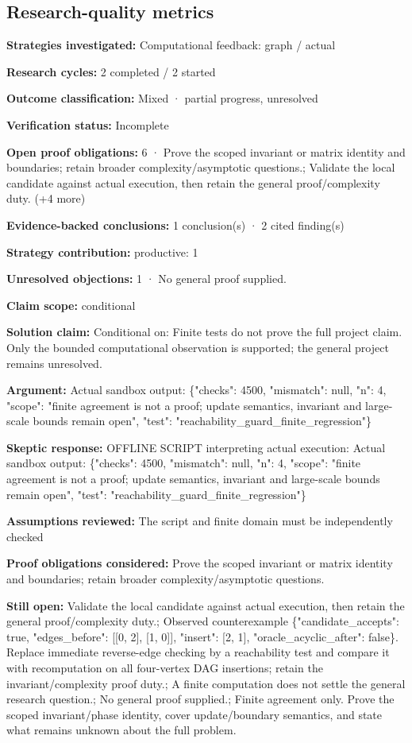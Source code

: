 \documentclass[11pt]{article}
\begin{document}
\subsection{Research-quality metrics}
\textbf{Strategies investigated:} Computational feedback: graph / actual\par
\textbf{Research cycles:} 2 completed / 2 started\par
\textbf{Outcome classification:} Mixed · partial progress, unresolved\par
\textbf{Verification status:} Incomplete\par
\textbf{Open proof obligations:} 6 · Prove the scoped invariant or matrix identity and boundaries; retain broader complexity/asymptotic questions.; Validate the local candidate against actual execution, then retain the general proof/complexity duty. (+4 more)\par
\textbf{Evidence-backed conclusions:} 1 conclusion(s) · 2 cited finding(s)\par
\textbf{Strategy contribution:} productive: 1\par
\textbf{Unresolved objections:} 1 · No general proof supplied.\par
\textbf{Claim scope:} conditional\par
\textbf{Solution claim:} Conditional on: Finite tests do not prove the full project claim. Only the bounded computational observation is supported; the general project remains unresolved.\par
\textbf{Argument:} Actual sandbox output: \{"checks": 4500, "mismatch": null, "n": 4, "scope": "finite agreement is not a proof; update semantics, invariant and large-scale bounds remain open", "test": "reachability\_guard\_finite\_regression"\}\par
\textbf{Skeptic response:} OFFLINE SCRIPT interpreting actual execution: Actual sandbox output: \{"checks": 4500, "mismatch": null, "n": 4, "scope": "finite agreement is not a proof; update semantics, invariant and large-scale bounds remain open", "test": "reachability\_guard\_finite\_regression"\}\par
\textbf{Assumptions reviewed:} The script and finite domain must be independently checked\par
\textbf{Proof obligations considered:} Prove the scoped invariant or matrix identity and boundaries; retain broader complexity/asymptotic questions.\par
\textbf{Still open:} Validate the local candidate against actual execution, then retain the general proof/complexity duty.; Observed counterexample \{"candidate\_accepts": true, "edges\_before": [[0, 2], [1, 0]], "insert": [2, 1], "oracle\_acyclic\_after": false\}. Replace immediate reverse-edge checking by a reachability test and compare it with recomputation on all four-vertex DAG insertions; retain the invariant/complexity proof duty.; A finite computation does not settle the general research question.; No general proof supplied.; Finite agreement only. Prove the scoped invariant/phase identity, cover update/boundary semantics, and state what remains unknown about the full problem.\par
\end{document}
